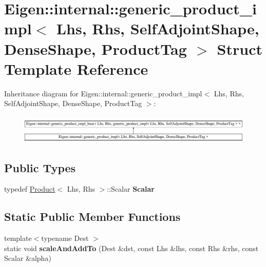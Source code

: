 \hypertarget{struct_eigen_1_1internal_1_1generic__product__impl_3_01_lhs_00_01_rhs_00_01_self_adjoint_shape_06e3f81c44c9a89e35e47ffcd48d159f9}{}\section{Eigen\+::internal\+::generic\+\_\+product\+\_\+impl$<$ Lhs, Rhs, Self\+Adjoint\+Shape, Dense\+Shape, Product\+Tag $>$ Struct Template Reference}
\label{struct_eigen_1_1internal_1_1generic__product__impl_3_01_lhs_00_01_rhs_00_01_self_adjoint_shape_06e3f81c44c9a89e35e47ffcd48d159f9}
Inheritance diagram for Eigen\+::internal\+::generic\+\_\+product\+\_\+impl$<$ Lhs, Rhs, Self\+Adjoint\+Shape, Dense\+Shape, Product\+Tag $>$\+:\begin{figure}[H]
\begin{center}
\leavevmode
\includegraphics[height=1.396509cm]{struct_eigen_1_1internal_1_1generic__product__impl_3_01_lhs_00_01_rhs_00_01_self_adjoint_shape_06e3f81c44c9a89e35e47ffcd48d159f9}
\end{center}
\end{figure}
\subsection*{Public Types}
\begin{DoxyCompactItemize}
\item 
\mbox{\label{struct_eigen_1_1internal_1_1generic__product__impl_3_01_lhs_00_01_rhs_00_01_self_adjoint_shape_06e3f81c44c9a89e35e47ffcd48d159f9_a6db408b4899bdb58e781c7a768fa7e2b}} 
typedef \mbox{\hyperlink{class_eigen_1_1_product}{Product}}$<$ Lhs, Rhs $>$\+::Scalar {\bfseries Scalar}
\end{DoxyCompactItemize}
\subsection*{Static Public Member Functions}
\begin{DoxyCompactItemize}
\item 
\mbox{\label{struct_eigen_1_1internal_1_1generic__product__impl_3_01_lhs_00_01_rhs_00_01_self_adjoint_shape_06e3f81c44c9a89e35e47ffcd48d159f9_ae91451cb1d24f97370f1d3d87564ab6b}} 
{\footnotesize template$<$typename Dest $>$ }\\static void {\bfseries scale\+And\+Add\+To} (Dest \&dst, const Lhs \&lhs, const Rhs \&rhs, const Scalar \&alpha)
\end{DoxyCompactItemize}


